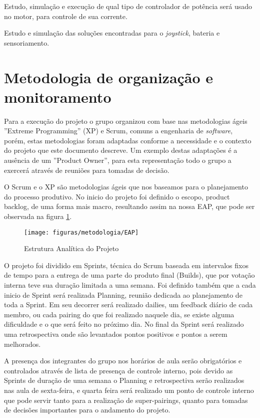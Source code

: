 	Estudo, simulação e execução de qual tipo de controlador de potência será usado no motor, para controle de sua corrente.

	Estudo e simulação das soluções encontradas para o \textit{joystick}, bateria e sensoriamento.

\section{Metodologia de organização e monitoramento}

Para a execução do projeto o grupo organizou com base nas metodologias ágeis ''Extreme Programming'' (XP) e Scrum, comuns a engenharia de \textit{software}, porém, estas metodologias foram adaptadas conforme a necessidade e o contexto do projeto que este documento descreve. Um exemplo destas adaptações é a ausência de um ''Product Owner'', para esta representação todo o grupo a exercerá através de reuniões para tomadas de decisão.

O Scrum e o XP são metodologias ágeis que nos baseamos para o planejamento do processo produtivo. No inicio do projeto foi definido o escopo, product backlog, de uma forma mais macro, resultando assim na nossa EAP, que pode ser observada na figura \ref{fig:eap}.

\begin{figure}[!htb]
\centering
  \texttt{[image: figuras/metodologia/EAP]}
\caption{Estrutura Analítica do Projeto}
\label{fig:eap}
\end{figure}

O projeto foi dividido em Sprints, técnica do Scrum baseada em intervalos fixos de tempo para a entrega de uma parte do produto final (Builds), que por votação interna teve sua duração limitada a uma semana. Foi definido também que a cada inicio de Sprint será realizada Planning, reunião dedicada ao planejamento de toda a Sprint. Em seu decorrer será realizado dailies, um feedback diário de cada membro, ou cada pairing do que foi realizado naquele dia, se existe alguma dificuldade e o que será feito no próximo dia. No final da Sprint será realizado uma retrospectiva onde são levantados pontos positivos e pontos a serem melhorados.

A presença dos integrantes do grupo nos horários de aula serão obrigatórios e controlados através de lista de presença de controle interno, pois devido as Sprints de duração de uma semana o Planning e retrospectiva serão realizados nas aula de sexta-feira, e quarta feira será realizado um ponto de controle interno que pode servir tanto para a realização de super-pairings, quanto para tomadas de decisões importantes para o andamento do projeto.

